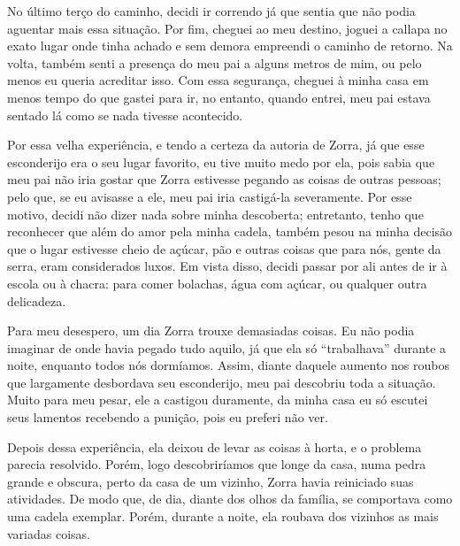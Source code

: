 No último terço do caminho, decidi ir correndo já que sentia que não podia aguentar mais essa situação. Por fim, cheguei ao meu destino, joguei a callapa no exato lugar onde tinha achado e sem demora empreendi o caminho de retorno.
Na volta, também senti a presença do meu pai a alguns metros de mim, ou pelo menos eu queria acreditar isso. Com essa segurança, cheguei à minha casa em menos tempo do que gastei para ir, no entanto, quando entrei, meu pai estava sentado lá como se nada tivesse acontecido.


Por essa velha experiência, e tendo a certeza da autoria de Zorra, já que esse esconderijo era o seu lugar favorito, eu tive muito medo por ela, pois sabia que meu pai não iria gostar que Zorra estivesse pegando as coisas de outras pessoas; pelo que, se eu avisasse a ele, meu pai iria castigá-la severamente. Por esse motivo, decidi não dizer nada sobre minha descoberta; entretanto, tenho que reconhecer que além do amor pela minha cadela, também pesou na minha decisão que o lugar estivesse cheio de açúcar, pão e outras coisas que para nós, gente da serra, eram considerados luxos. 
Em vista disso, decidi passar por ali antes de ir à escola ou à chacra: para comer bolachas, água com açúcar, ou qualquer outra delicadeza. 

Para meu desespero, um dia Zorra trouxe demasiadas coisas. Eu  não podia imaginar de onde havia pegado tudo aquilo, já que ela só ``trabalhava'' durante a noite, enquanto todos nós dormíamos. Assim, diante daquele aumento nos roubos que largamente desbordava seu esconderijo, meu pai descobriu toda a situação.
Muito para meu pesar, ele a castigou duramente, da minha casa eu só escutei seus lamentos recebendo a punição, pois eu preferi não ver.


Depois dessa experiência, ela deixou de levar as coisas à horta, e o problema parecia resolvido. Porém, logo descobriríamos que longe da casa, numa pedra grande e obscura, perto da casa de um vizinho, 
Zorra havia reiniciado suas atividades. De modo que, de dia, diante dos olhos da família, se comportava como uma cadela exemplar. Porém, durante a noite, ela roubava dos vizinhos as mais variadas coisas.

